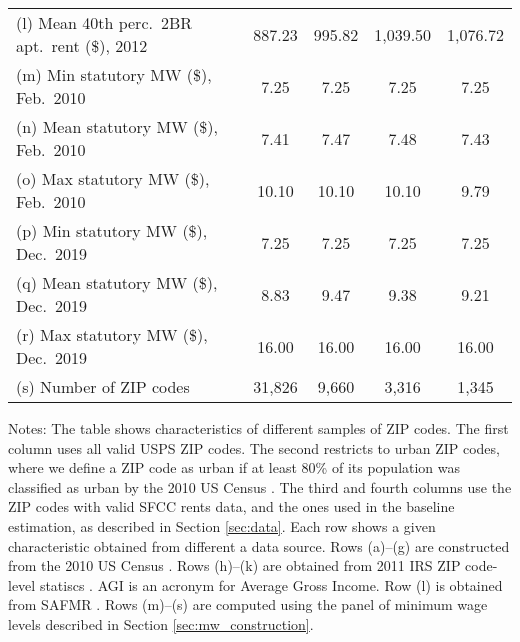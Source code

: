 \begin{landscape}
\begin{table}[hbt!]
\begin{tabular}{@{}lcccc@{}}
        (l) Mean 40th perc.\ 2BR apt.\ rent (\$), 2012   & 887.23   & 995.82  & 1,039.50  & 1,076.72     \\
        (m) Min statutory MW (\$), Feb.\ 2010            & 7.25   & 7.25  & 7.25  & 7.25                \\
        (n) Mean statutory MW (\$), Feb.\ 2010           & 7.41   & 7.47  & 7.48  & 7.43                \\
        (o) Max statutory MW (\$), Feb.\ 2010            & 10.10   & 10.10  & 10.10  & 9.79              \\
        (p) Min statutory MW (\$), Dec.\ 2019            & 7.25   & 7.25  & 7.25  & 7.25                 \\
        (q) Mean statutory MW (\$), Dec.\ 2019           & 8.83   & 9.47  & 9.38  & 9.21                 \\
        (r) Max statutory MW (\$), Dec.\ 2019            & 16.00   & 16.00  & 16.00  & 16.00              \\
        (s) Number of ZIP codes                          & 31,826  & 9,660 & 3,316 & 1,345               \\ \bottomrule
    \end{tabular}

    \begin{minipage}{.95\linewidth} \footnotesize
        \vspace{2mm}
        Notes: The table shows characteristics of different samples of ZIP codes.
        The first column uses all valid USPS ZIP codes.
        The second restricts to urban ZIP codes, where we define a ZIP code as 
        urban if at least 80\% of its population was classified as urban 
        by the 2010 US Census \parencite{CensusDecennial}.
        The third and fourth columns use the ZIP codes with valid SFCC rents 
        data, and the ones used in the baseline estimation, as described in
        Section \ref{sec:data}.
        Each row shows a given characteristic obtained from different a data 
        source.
        Rows (a)--(g) are constructed from the 2010 US Census \parencite{CensusDecennial}.
        Rows (h)--(k) are obtained from 2011 IRS ZIP code-level statiscs 
        \parencite{IRS}. AGI is an acronym for Average Gross Income.
        Row (l) is obtained from SAFMR \parencite{hudSAFMR}.
        Rows (m)--(s) are computed using the panel of minimum wage levels 
        described in Section \ref{sec:mw_construction}.
    \end{minipage}
\end{table}
\end{landscape}
